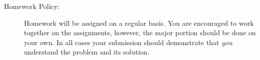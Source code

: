 \documentclass[10pt]{article}
\begin{document}
\begin{description}


\item [Homework Policy:]
Homework will be assigned on a regular basis. You are encouraged to work together on the assignments,
however, the major portion should be done on your own. In all cases your submission should demonstrate that {\it you} 
understand the problem and its solution.  


\end{description}
\end{document}
